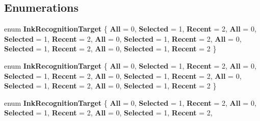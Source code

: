 \subsection*{Enumerations}
\begin{DoxyCompactItemize}
\item 
\mbox{\label{namespace_windows_1_1_u_i_1_1_input_1_1_inking_abaa7a28e27eb8ea61a8cf8c5b63fb20d}} 
enum {\bfseries Ink\+Recognition\+Target} \{ \newline
{\bfseries All} = 0, 
{\bfseries Selected} = 1, 
{\bfseries Recent} = 2, 
{\bfseries All} = 0, 
\newline
{\bfseries Selected} = 1, 
{\bfseries Recent} = 2, 
{\bfseries All} = 0, 
{\bfseries Selected} = 1, 
\newline
{\bfseries Recent} = 2, 
{\bfseries All} = 0, 
{\bfseries Selected} = 1, 
{\bfseries Recent} = 2, 
\newline
{\bfseries All} = 0, 
{\bfseries Selected} = 1, 
{\bfseries Recent} = 2
 \}
\item 
\mbox{\label{namespace_windows_1_1_u_i_1_1_input_1_1_inking_abaa7a28e27eb8ea61a8cf8c5b63fb20d}} 
enum {\bfseries Ink\+Recognition\+Target} \{ \newline
{\bfseries All} = 0, 
{\bfseries Selected} = 1, 
{\bfseries Recent} = 2, 
{\bfseries All} = 0, 
\newline
{\bfseries Selected} = 1, 
{\bfseries Recent} = 2, 
{\bfseries All} = 0, 
{\bfseries Selected} = 1, 
\newline
{\bfseries Recent} = 2, 
{\bfseries All} = 0, 
{\bfseries Selected} = 1, 
{\bfseries Recent} = 2, 
\newline
{\bfseries All} = 0, 
{\bfseries Selected} = 1, 
{\bfseries Recent} = 2
 \}
\item 
\mbox{\label{namespace_windows_1_1_u_i_1_1_input_1_1_inking_abaa7a28e27eb8ea61a8cf8c5b63fb20d}} 
enum {\bfseries Ink\+Recognition\+Target} \{ \newline
{\bfseries All} = 0, 
{\bfseries Selected} = 1, 
{\bfseries Recent} = 2, 
{\bfseries All} = 0, 
\newline
{\bfseries Selected} = 1, 
{\bfseries Recent} = 2, 
{\bfseries All} = 0, 
{\bfseries Selected} = 1, 
\newline
{\bfseries Recent} = 2, 

\end{DoxyCompactItemize}
